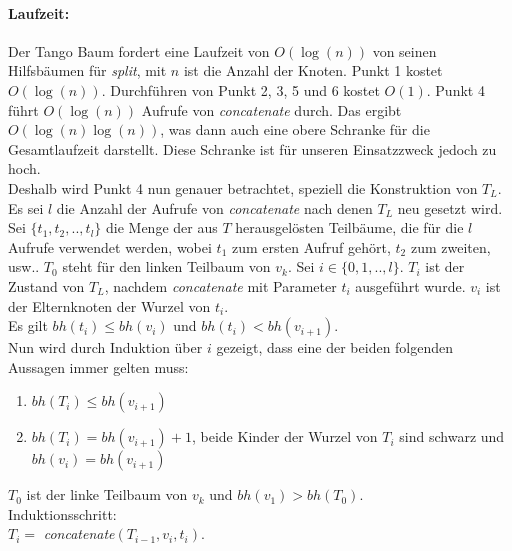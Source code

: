 \documentclass[a4paper,12pt]{article}
\begin{document}
\paragraph{Laufzeit:}
Der Tango Baum fordert eine Laufzeit von $O(\log(n))$ von seinen Hilfsbäumen für \textit{split}, mit $n$ ist die Anzahl der Knoten. Punkt 1 kostet $O(\log(n))$. Durchführen von Punkt 2, 3, 5 und 6 kostet $O(1)$. Punkt 4 führt $O(\log (n))$ Aufrufe von \textit{concatenate} durch. Das ergibt $O(\log (n) \log (n))$, was dann auch eine obere Schranke für die Gesamtlaufzeit darstellt. Diese Schranke ist für unseren Einsatzzweck jedoch zu hoch.\\ Deshalb wird Punkt 4 nun genauer betrachtet, speziell die Konstruktion von $T_L$. Es sei $l$ die Anzahl der Aufrufe von \textit{concatenate} nach denen $T_L$ neu gesetzt wird. Sei $\{t_1,t_2,..,t_l\}$ die Menge der aus $T$ herausgelösten Teilbäume, die für die $l$ Aufrufe verwendet werden, wobei $t_1$ zum ersten Aufruf gehört, $t_2$ zum zweiten, usw.. $T_0$ steht für den linken Teilbaum von $v_k$.  Sei $i \in \{0, 1, .., l\}$. $T_i$ ist der Zustand von $T_L$, nachdem \textit{concatenate} mit Parameter $t_i$ ausgeführt wurde. $v_i$ ist der Elternknoten der Wurzel von $t_i$.\\

\noindent
Es gilt $\mathit{bh} \left(t_i \right) \leq \mathit{bh} \left(v_{i} \right)$ und $\mathit{bh} \left(t_i \right) < \mathit{bh} \left(v_{i+1} \right)$.\\
Nun wird durch Induktion über $i$ gezeigt, dass eine der beiden folgenden Aussagen immer gelten muss:\\
\bigskip
\begin{enumerate}
	\item  $\mathit{bh} \left(T_{i} \right) \leq  \mathit{bh} \left(v_{i+1} \right)$
	\item $\mathit{bh} \left(T_{i} \right) =  \mathit{bh} \left(v_{i+1} \right) +1$, beide Kinder der Wurzel von $T_i$ sind schwarz und $\mathit{bh} \left(v_{i} \right) = \mathit{bh} \left(v_{i+1} \right)$
\end{enumerate}
 
$T_0$ ist der linke Teilbaum von $v_k$ und $\mathit{bh} \left(v_{1} \right) > \mathit{bh} \left(T_{0} \right)$.\\
Induktionsschritt:\\
$T_i =$ \textit{concatenate}$\left(T_{i-1}, v_i, t_i\right)$.\\
\end{document}
